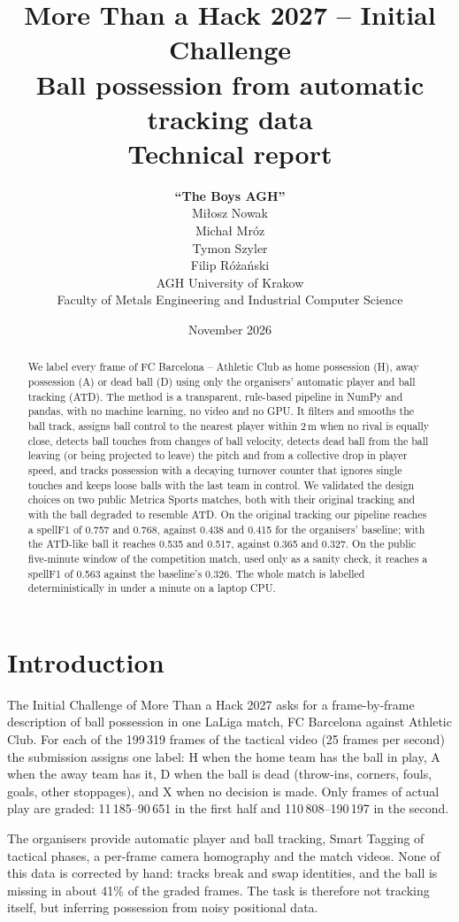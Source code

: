 \documentclass[11pt,a4paper]{article}
\title{More Than a Hack 2027 -- Initial Challenge\\[4pt]
  \large Ball possession from automatic tracking data\\[2pt]
  \normalsize Technical report}
\author{\textbf{``The Boys AGH''}\\[6pt]
  Miłosz Nowak\\ Michał Mróz\\ Tymon Szyler\\ Filip Różański\\[6pt]
  AGH University of Krakow\\
  Faculty of Metals Engineering and Industrial Computer Science}
\date{November 2026}
\begin{document}
\maketitle

\begin{abstract}
We label every frame of FC Barcelona -- Athletic Club as home possession (H), away possession (A) or dead ball (D)
using only the organisers' automatic player and ball tracking (ATD). The method is a transparent, rule-based pipeline
in NumPy and pandas, with no machine learning, no video and no GPU. It filters and smooths the ball track, assigns
ball control to the nearest player within 2\,m when no rival is equally close, detects ball touches from changes of
ball velocity, detects dead ball from the ball leaving (or being projected to leave) the pitch and from a collective
drop in player speed, and tracks possession with a decaying turnover counter that ignores single touches and keeps
loose balls with the last team in control. We validated the design choices on two public Metrica Sports matches,
both with their original tracking and with the ball degraded to resemble ATD. On the
original tracking our pipeline reaches a spellF1 of 0.757 and 0.768, against 0.438 and 0.415 for the organisers'
baseline; with the ATD-like ball it reaches 0.535 and 0.517, against 0.365 and 0.327. On the public five-minute window
of the competition match, used only as a sanity check, it reaches a spellF1 of 0.563 against the baseline's
0.326. The whole match is labelled deterministically in under a minute on a laptop CPU.
\end{abstract}

\section{Introduction}
The Initial Challenge of More Than a Hack 2027 asks for a frame-by-frame description of ball possession in one LaLiga
match, FC Barcelona against Athletic Club. For each of the 199\,319 frames of the tactical video (25 frames per second)
the submission assigns one label: H when the home team has the ball in play, A when the away team has it, D when the
ball is dead (throw-ins, corners, fouls, goals, other stoppages), and X when no decision is made. Only frames of actual
play are graded: 11\,185--90\,651 in the first half and 110\,808--190\,197 in the second.

The organisers provide automatic player and ball tracking, Smart Tagging of tactical phases, a per-frame camera
homography and the match videos. None of this data is corrected by hand: tracks break and swap identities, and the
ball is missing in about 41\% of the graded frames. The task is therefore not tracking itself, but inferring possession
from noisy positional data.
\end{document}
